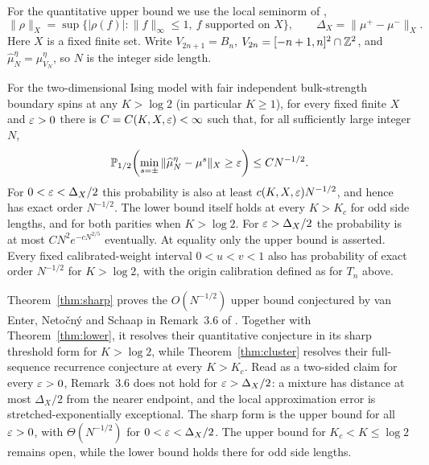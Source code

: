 For the quantitative upper bound we use the local seminorm of \cite[(1)]{vENS05},
\[
 \|\rho\|_X=\sup\{|\rho(f)|:\|f\|_\infty\le1,\ f\text{ supported on }X\},\qquad
 \Delta_X=\|\mu^+-\mu^-\|_X.
\]
Here $X$ is a fixed finite set. Write $V_{2n+1}=B_n$, $V_{2n}=[-n+1,n]^2\cap\mathbb Z^2$, and $\widehat\mu_N^\eta=\mu_{V_N}^\eta$, so $N$ is the integer side length.
\begin{maintheorem}\label{thm:sharp}
For the two-dimensional Ising model with fair independent bulk-strength boundary spins at any $K>\log2$ (in particular $K\ge1$), for every fixed finite $X$ and $\varepsilon>0$ there is $C=C(K,X,\varepsilon)<\infty$ such that, for all sufficiently large integer $N$,
\begin{equation}\label{eq:sharpmain}
 \mathbb P_{1/2}\!\left(\min_{s=\pm}\|\widehat\mu_N^\eta-\mu^s\|_X\ge\varepsilon\right)
 \le C N^{-1/2}.
\end{equation}
For $0<\varepsilon<\Delta_X/2$ this probability is also at least $c(K,X,\varepsilon)N^{-1/2}$, and hence has exact order $N^{-1/2}$. The lower bound itself holds at every $K>K_c$ for odd side lengths, and for both parities when $K>\log2$. For $\varepsilon>\Delta_X/2$ the probability is at most $CN^2e^{-cN^{2/5}}$ eventually. At equality only the upper bound is asserted. Every fixed calibrated-weight interval $0<u<v<1$ also has probability of exact order $N^{-1/2}$ for $K>\log2$, with the origin calibration defined as for $T_n$ above.
\end{maintheorem}

Theorem~\ref{thm:sharp} proves the $O(N^{-1/2})$ upper bound conjectured by van Enter, Neto\v cn\'y and Schaap in Remark~3.6 of \cite{vENS05}. Together with Theorem~\ref{thm:lower}, it resolves their quantitative conjecture in its sharp threshold form for $K>\log2$, while Theorem~\ref{thm:cluster} resolves their full-sequence recurrence conjecture at every $K>K_c$. Read as a two-sided claim for every $\varepsilon>0$, Remark~3.6 does not hold for $\varepsilon>\Delta_X/2$: a mixture has distance at most $\Delta_X/2$ from the nearer endpoint, and the local approximation error is stretched-exponentially exceptional. The sharp form is the upper bound for all $\varepsilon>0$, with $\Theta(N^{-1/2})$ for $0<\varepsilon<\Delta_X/2$. The upper bound for $K_c<K\le\log2$ remains open, while the lower bound holds there for odd side lengths.

